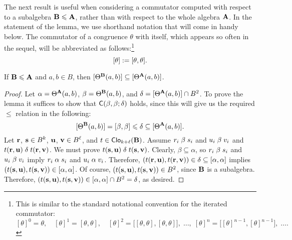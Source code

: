 The next result is useful when considering a commutator computed
with respect to a subalgebra $\mathbf{B} \leqslant \mathbf{A}$, rather than with respect to the
whole algebra $\mathbf{A}$.
In the statement of the lemma, we use shorthand notation that will come in handy below.
The commutator %
of a congruence $\theta$ with itself, which appears so often in the sequel,
will be abbreviated as follows:\footnote{This is similar to the standard notational convention
  for the iterated commutator:
  \[
    [\theta]^0 =  \theta, \quad
    [\theta]^1 =  [\theta, \theta],  \quad
    [\theta]^2 =  \bigl[[\theta, \theta],[\theta, \theta]\bigr],  \; \dots, \;
    [\theta]^n =  \bigl[[\theta]^{n-1}, [\theta]^{n-1}\bigr], \; \dots.
    \]
}
\[
[\theta]:= [\theta, \theta].
\]



\begin{lem}
\label{lem:subalgebra-comm}
If $\mathbf{B} \leqslant \mathbf{A}$ and $a, b \in B$, then 
$[\Theta^{\mathbf{B}} (a, b)] \subseteq [\Theta^{\mathbf{A}} (a, b)]$. %
\end{lem}
\begin{proof}
  Let $\alpha = \Theta^{\mathbf{A}} (a, b)$, $\beta = \Theta^{\mathbf{B}} (a, b)$, and
  $\delta=[\Theta^{\mathbf{A}} (a, b)] \cap B^2$. 
  To prove the lemma it suffices to show that
  $\mathsf{C}(\beta, \beta; \delta)$ holds, since this will give us
  the required $\leq$ relation in the following:
  \[[\Theta^{\mathbf{B}}(a,b)] = [\beta, \beta] \leqslant \delta \subseteq [\Theta^{\mathbf{A}}(a,b)].\]
  Let $\mathbf{r}$, $\mathbf{s} \in B^{k}$, 
  $\mathbf{u}$, $\mathbf{v} \in B^{\ell}$, and $t\in \operatorname{\mathsf{Clo}}_{k+\ell}(\mathbf{B})$.
  Assume $r_i \mathrel{\beta} s_i$ and $u_i \mathrel{\beta} v_i$ and $t(\mathbf{r}, \mathbf{u}) \mathrel{\delta} t(\mathbf{r}, \mathbf{v})$.
  We must prove $t(\mathbf{s}, \mathbf{u}) \mathrel{\delta} t(\mathbf{s}, \mathbf{v})$.
  Clearly, $\beta \subseteq \alpha$, so $r_i \mathrel{\beta} s_i$ and $u_i \mathrel{\beta} v_i$ imply
  $r_i \mathrel{\alpha} s_i$ and $u_i \mathrel{\alpha} v_i$.  Therefore, 
  $(t(\br, \bu), t(\br, \bv)) \in \delta  %
  \subseteq \com{\alpha}$ implies
  $(t(\mathbf{s}, \mathbf{u}), t(\mathbf{s}, \mathbf{v})) \in [\alpha, \alpha]$.
  Of course, $(t(\mathbf{s}, \mathbf{u}), t(\mathbf{s}, \mathbf{v})) \in B^2$, since $\mathbf{B}$ is a subalgebra. 
  Therefore, $(t(\mathbf{s}, \mathbf{u}), t(\mathbf{s}, \mathbf{v})) \in [\alpha, \alpha]\cap B^2 = \delta$, as desired.
\end{proof}



